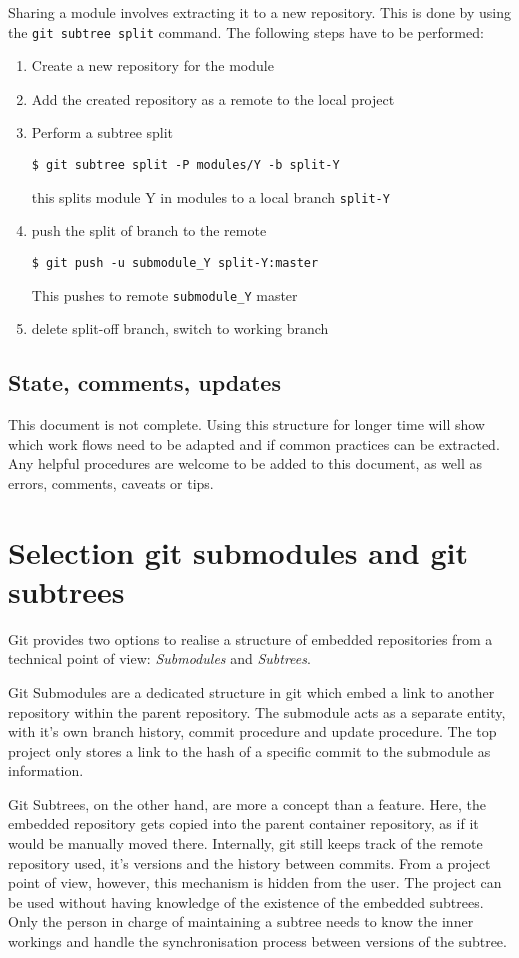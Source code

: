 \documentclass{scrartcl}
\begin{document}
Sharing a module involves extracting it to a new repository. This is
done by using the \verb|git subtree split| command. The following
steps have to be performed:
\begin{enumerate}
\item Create a new repository for the module
\item Add the created repository as a remote to the local project
\item Perform a subtree split
\begin{verbatim}
$ git subtree split -P modules/Y -b split-Y
\end{verbatim}
  this splits module Y in modules to a local branch \verb|split-Y|
\item push the split of branch to the remote
\begin{verbatim}
$ git push -u submodule_Y split-Y:master
\end{verbatim}
  This pushes to remote \verb|submodule_Y| master
\item delete split-off branch, switch to working branch
\end{enumerate}

\subsection{State, comments, updates}

This document is not complete. Using this structure for longer time
will show which work flows need to be adapted and if common practices
can be extracted. Any helpful procedures are welcome to be added to
this document, as well as errors, comments, caveats or tips.

\appendix
\section{Selection git submodules and git subtrees}

Git provides two options to realise a structure of embedded
repositories from a technical point of view: \emph{Submodules} and
\emph{Subtrees}.

Git Submodules are a dedicated structure in git which embed a link to
another repository within the parent repository. The submodule acts as
a separate entity, with it's own branch history, commit procedure and
update procedure. The top project only stores a link to the hash of a
specific commit to the submodule as information.

Git Subtrees, on the other hand, are more a concept than a
feature. Here, the embedded repository gets copied into the parent
container repository, as if it would be manually moved
there. Internally, git still keeps track of the remote repository
used, it's versions and the history between commits. From a project
point of view, however, this mechanism is hidden from the user. The
project can be used without having knowledge of the existence of the
embedded subtrees. Only the person in charge of maintaining a subtree
needs to know the inner workings and handle the synchronisation
process between versions of the subtree.
\end{document}
